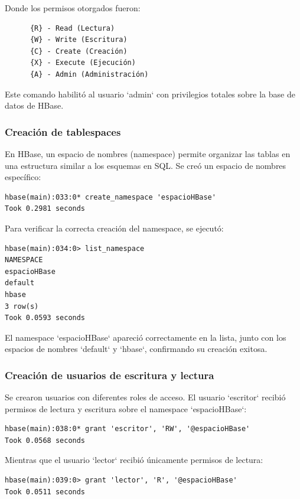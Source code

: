 \documentclass{article}
\begin{document}
Donde los permisos otorgados fueron:
\begin{verbatim}
      {R} - Read (Lectura)
      {W} - Write (Escritura)
      {C} - Create (Creación)
      {X} - Execute (Ejecución)
      {A} - Admin (Administración)
\end{verbatim}

Este comando habilitó al usuario `admin` con privilegios totales sobre la base de datos de HBase.

\subsubsection{Creación de tablespaces}

En HBase, un espacio de nombres (namespace) permite organizar las tablas en una estructura similar a los esquemas en SQL. Se creó un espacio de nombres específico:

\begin{lstlisting}[style=bashStyle]
hbase(main):033:0* create_namespace 'espacioHBase'
Took 0.2981 seconds
\end{lstlisting}

Para verificar la correcta creación del namespace, se ejecutó:

\begin{lstlisting}[style=bashStyle]
hbase(main):034:0> list_namespace
NAMESPACE
espacioHBase
default
hbase
3 row(s)
Took 0.0593 seconds
\end{lstlisting}

El namespace `espacioHBase` apareció correctamente en la lista, junto con los espacios de nombres `default` y `hbase`, confirmando su creación exitosa.


\subsubsection{Creación de usuarios de escritura y lectura}

Se crearon usuarios con diferentes roles de acceso. El usuario `escritor` recibió permisos de lectura y escritura sobre el namespace `espacioHBase`:

\begin{lstlisting}[style=bashStyle]
hbase(main):038:0* grant 'escritor', 'RW', '@espacioHBase'
Took 0.0568 seconds
\end{lstlisting}

Mientras que el usuario `lector` recibió únicamente permisos de lectura:

\begin{lstlisting}[style=bashStyle]
hbase(main):039:0> grant 'lector', 'R', '@espacioHBase'
Took 0.0511 seconds
\end{lstlisting}
\end{document}
